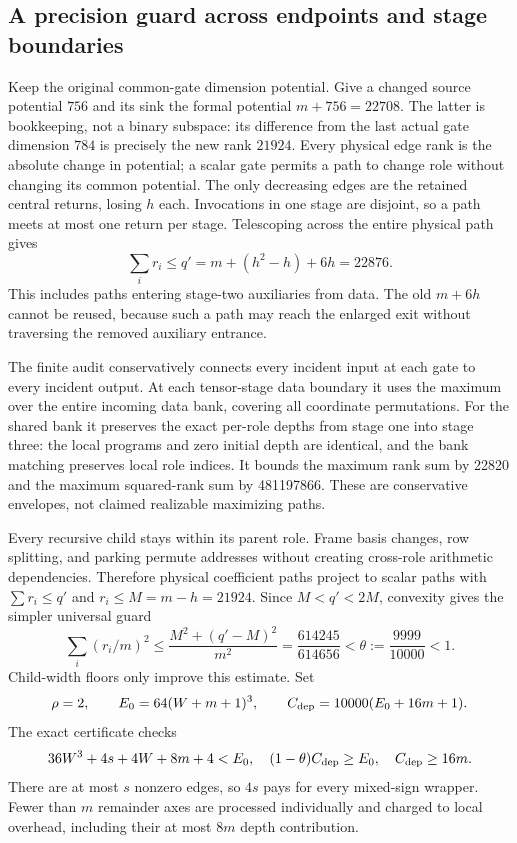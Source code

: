 \subsection{A precision guard across endpoints and stage boundaries}
\label{sec:translated-complex-guard}
Keep the original common-gate dimension potential. Give a changed source
potential $756$ and its sink the formal potential $m+756=22708$.
The latter is bookkeeping, not a binary subspace: its difference from the
last actual gate dimension $784$ is precisely the new rank $21924$.
Every physical edge rank is the absolute change in potential; a scalar
gate permits a path to change role without changing its common potential.
The only decreasing edges are the retained central returns, losing $h$
each. Invocations in one stage are disjoint, so a path meets at most one
return per stage. Telescoping across the entire physical path gives
\[
 \sum_i r_i\le q'=m+(h^2-h)+6h=22876.
\]
This includes paths entering stage-two auxiliaries from data. The old
$m+6h$ cannot be reused, because such a path may reach the enlarged exit
without traversing the removed auxiliary entrance.

The finite audit conservatively connects every incident input at each
gate to every incident output. At each tensor-stage data boundary it uses
the maximum over the entire incoming data bank, covering all coordinate
permutations. For the shared bank it preserves the exact per-role depths
from stage one into stage three: the local programs and zero initial
depth are identical, and the bank matching preserves local role indices.
It bounds the maximum rank sum by 22820 and the maximum squared-rank sum
by 481197866. These are conservative envelopes, not claimed realizable
maximizing paths.

Every recursive child stays within its parent role. Frame basis changes,
row splitting, and parking permute addresses without creating cross-role
arithmetic dependencies. Therefore physical coefficient paths project to
scalar paths with $\sum r_i\le q'$ and $r_i\le M=m-h=21924$.
Since $M<q'<2M$, convexity gives the simpler universal guard
\[
 \sum_i(r_i/m)^2\le\frac{M^2+(q'-M)^2}{m^2}
 =\frac{614245}{614656}<\theta:=\frac{9999}{10000}<1.
\]
Child-width floors only improve this estimate. Set
\[
 \rho=2,\qquad E_0=64(W+m+1)^3,\qquad
 C_{\rm dep}=10000(E_0+16m+1).
\]
The exact certificate checks
\[
 36W^3+4s+4W+8m+4<E_0,\quad
 (1-\theta)C_{\rm dep}\ge E_0,\quad C_{\rm dep}\ge16m.
\]
There are at most $s$ nonzero edges, so $4s$ pays for every mixed-sign
wrapper. Fewer than $m$ remainder axes are processed individually and
charged to local overhead, including their at most $8m$ depth contribution.

